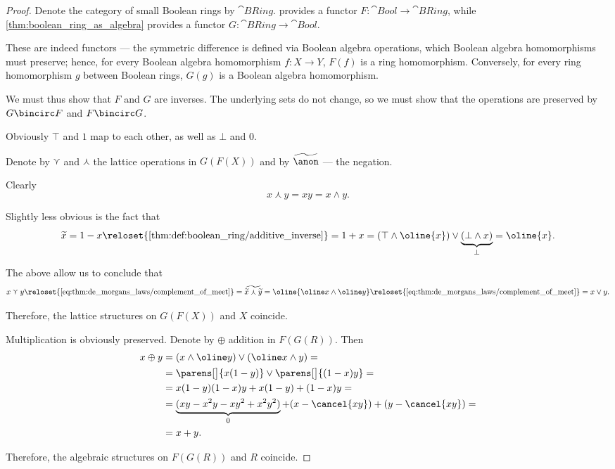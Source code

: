 \begin{proof}
  Denote the category of small Boolean rings by \( \cat{BRing} \).  provides a functor \( F: \cat{Bool} \to \cat{BRing} \), while \cref{thm:boolean_ring_as_algebra} provides a functor \( G: \cat{BRing} \to \cat{Bool} \).

  These are indeed functors --- the symmetric difference is defined via Boolean algebra operations, which Boolean algebra homomorphisms must preserve; hence, for every Boolean algebra homomorphism \( f: X \to Y \), \( F(f) \) is a ring homomorphism. Conversely, for every ring homomorphism \( g \) between Boolean rings, \( G(g) \) is a Boolean algebra homomorphism.

  We must thus show that \( F \) and \( G \) are inverses. The underlying sets do not change, so we must show that the operations are preserved by \( G \bincirc F \) and \( F \bincirc G \).

   Obviously \( \top \) and \( 1 \) map to each other, as well as \( \bot \) and \( 0 \).

  Denote by \( \curlyvee \) and \( \curlywedge \) the lattice operations in \( G(F(X)) \) and by \( \widetilde{\anon} \) --- the negation.

  Clearly
  \begin{equation*}
    x \curlywedge y = xy = x \wedge y.
  \end{equation*}

  Slightly less obvious is the fact that
  \begin{equation*}
    \widetilde{x}
    =
    1 - x
    \reloset {\ref{thm:def:boolean_ring/additive_inverse}}
    =
    1 + x
    =
    (\top \wedge \oline{x}) \vee \underbrace{(\bot \wedge x)}_\bot
    =
    \oline{x}.
  \end{equation*}

  The above allow us to conclude that
  \begin{equation*}
    x \curlyvee y
    \reloset {\eqref{eq:thm:de_morgans_laws/complement_of_meet}} =
    \widetilde{ \widetilde x \curlywedge \widetilde y }
    =
    \oline{ \oline x \wedge \oline y }
    \reloset {\eqref{eq:thm:de_morgans_laws/complement_of_meet}} =
    x \vee y.
  \end{equation*}

  Therefore, the lattice structures on \( G(F(X)) \) and \( X \) coincide.

   Multiplication is obviously preserved. Denote by \( \oplus \) addition in \( F(G(R)) \). Then
  \begin{align*}
    x \oplus y
    &=
    (x \wedge \oline y) \vee (\oline x \wedge y)
    = \\ &=
    \parens[\big]{ x (1 - y) } \vee \parens[\big]{ (1 - x) y }
    = \\ &=
    x (1 - y) (1 - x) y + x (1 - y) + (1 - x) y
    = \\ &=
    \underbrace{(xy - x^2y - x y^2 + x^2 y^2)}_0 + (x - \cancel{xy}) + (y - \cancel{xy})
    = \\ &=
    x + y.
  \end{align*}

  Therefore, the algebraic structures on \( F(G(R)) \) and \( R \) coincide.
\end{proof}
